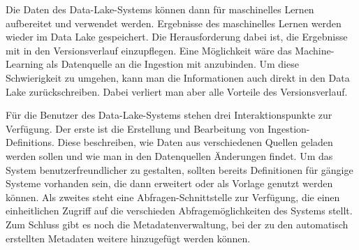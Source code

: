 Die Daten des Data-Lake-Systems können dann für maschinelles Lernen aufbereitet und verwendet werden.
Ergebnisse des maschinelles Lernen werden wieder im Data Lake gespeichert.
Die Herausforderung dabei ist, die Ergebnisse mit in den Versionsverlauf einzupflegen.
Eine Möglichkeit wäre das Machine-Learning als Datenquelle an die Ingestion mit anzubinden.
Um diese Schwierigkeit zu umgehen, kann man die Informationen auch direkt in den Data Lake zurückschreiben.
Dabei verliert man aber alle Vorteile des Versionsverlauf.

Für die Benutzer des Data-Lake-Systems stehen drei Interaktionspunkte zur Verfügung.
Der erste ist die Erstellung und Bearbeitung von Ingestion-Definitions.
Diese beschreiben, wie Daten aus verschiedenen Quellen geladen werden sollen und wie man in den Datenquellen Änderungen findet.
Um das System benutzerfreundlicher zu gestalten, sollten bereits Definitionen für gängige Systeme vorhanden sein, die dann erweitert oder als Vorlage genutzt werden können.
Als zweites steht eine Abfragen-Schnittstelle zur Verfügung, die einen einheitlichen Zugriff auf die verschieden Abfragemöglichkeiten des Systems stellt.
Zum Schluss gibt es noch die Metadatenverwaltung, bei der zu den automatisch erstellten Metadaten weitere hinzugefügt werden können.
